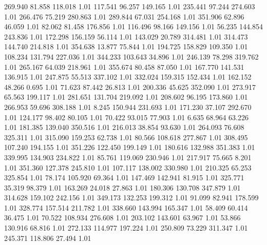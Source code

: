  269.940   81.858  118.018         1.01
 117.541   96.257  149.165         1.01
 235.441   97.244  274.603         1.01
 266.476   75.219  280.863         1.01
 289.844   67.031  254.168         1.01
 351.906   62.896   46.059         1.01
  82.062   81.458  176.856         1.01
 116.496   98.166  149.156         1.01
  56.235  144.854  243.836         1.01
 172.298  156.159   56.114         1.01
 143.029   20.789  314.481         1.01
 314.473  144.740  214.818         1.01
 354.638   13.877   75.844         1.01
 194.725  158.829  109.350         1.01
 108.234  131.794  227.036         1.01
 344.233  103.643   34.896         1.01
 246.139   78.298  319.762         1.01
 265.167   64.039  218.961         1.01
 355.674   80.458   87.050         1.01
 167.770  141.531  136.915         1.01
 247.875   55.513  337.102         1.01
 332.024  159.315  152.434         1.01
 162.152   48.266    0.695         1.01
  71.623   87.442   26.813         1.01
 200.336   45.625  352.090         1.01
 273.917   65.563  199.117         1.01
 281.651  131.704  219.092         1.01
 208.602   96.195  173.860         1.01
 266.953   59.696  308.188         1.01
   8.245  150.944  231.693         1.01
 171.230   37.107  292.670         1.01
 124.177   98.402   80.105         1.01
  70.422   93.015   77.903         1.01
   6.635   68.964   63.226         1.01
 181.385  139.040  350.516         1.01
 216.013   38.854   93.630         1.01
 264.093   76.608  325.311         1.01
 315.090  159.253   62.738         1.01
  80.566  108.618  277.867         1.01
 308.495  107.240  194.155         1.01
 351.226  122.450  199.149         1.01
 180.616  132.988  351.383         1.01
 339.995  134.903  234.822         1.01
  85.761  119.069  230.946         1.01
 217.917   75.665    8.201         1.01
 351.360  127.378  245.810         1.01
 107.117  138.002  330.980         1.01
 210.325   65.253  325.854         1.01
  78.174  105.920   69.364         1.01
 147.469  142.941   81.915         1.01
 325.771   35.319   98.379         1.01
 163.269   24.018   27.863         1.01
 180.306  130.708  347.879         1.01
 314.628  159.102  242.156         1.01
 349.173  132.253  199.312         1.01
  91.099   82.941  178.599         1.01
 328.774  157.514  211.782         1.01
 338.660  143.994  165.347         1.01
  58.409   60.414   36.475         1.01
  70.522  108.934  276.608         1.01
 203.102  143.601   63.967         1.01
  53.866  130.916   68.816         1.01
 272.133  114.977  197.224         1.01
 250.809   73.229  311.347         1.01
 245.371  118.806   27.494         1.01
